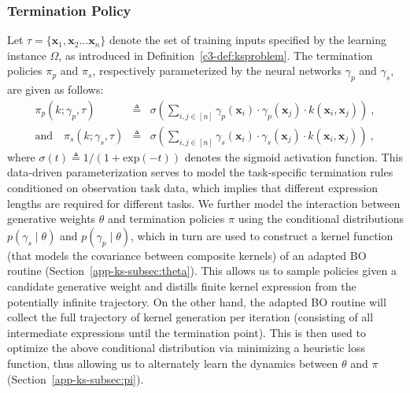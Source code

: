 \subsubsection{Termination Policy}
Let $\tau = \{\mathbf{x}_1, \mathbf{x}_2 \ldots \mathbf{x}_n\}$ denote the set of training inputs specified by the learning instance $\Omega$, as introduced in Definition~\ref{c3-def:ksproblem}. The termination policies $\pi_p$ and $\pi_s$, respectively parameterized by the neural networks $\gamma_p$ and $\gamma_s$, are given as follows:
\begin{eqnarray}
\pi_p(k; \gamma_p, \tau) &\triangleq& \sigma\left(\sum_{i,j\in[n]}\gamma_p(\mathbf{x}_i)\cdot\gamma_p(\mathbf{x}_j)\cdot k(\mathbf{x}_i,\mathbf{x}_j)\right)\nonumber \ , \\ 
\text{and} \quad \pi_s(k; \gamma_s, \tau) &\triangleq& \sigma\left(\sum_{i,j\in[n]}\gamma_s(\mathbf{x}_i)\cdot\gamma_s(\mathbf{x}_j)\cdot k(\mathbf{x}_i,\mathbf{x}_j)\right) \ ,
\end{eqnarray} 
where $\sigma(t) \triangleq 1/(1 + \mathrm{exp}(-t))$ denotes the sigmoid activation function. This data-driven parameterization serves to model the task-specific termination rules conditioned on observation task data, which implies that different expression lengths are required for different tasks. We further model the interaction between generative weights $\theta$ and termination policies $\pi$ using the conditional distributions $p(\gamma_s \mid \theta)$ and $p(\gamma_p \mid \theta)$, which in turn are used to construct a kernel function (that models the covariance between composite kernels) of an adapted BO routine (Section~\ref{app-ks-subsec:theta}). This allows us to sample policies given a candidate generative weight and distills finite kernel expression from the potentially infinite trajectory. On the other hand, the adapted BO routine will collect the full trajectory of kernel generation per iteration (consisting of all intermediate expressions until the termination point). This is then used to optimize the above conditional distribution via minimizing a heuristic loss function, thus allowing us to alternately learn the dynamics between $\theta$ and $\pi$ (Section~\ref{app-ks-subsec:pi}).

